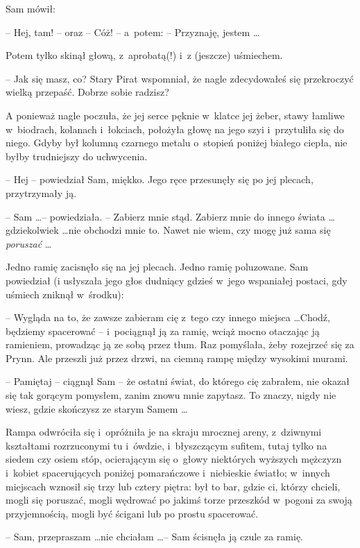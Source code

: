 \documentclass[oneside,polish,11pt,rmheadings]{mwbk}
\begin{document}
Sam mówił: 

-- Hej, tam! -- oraz -- Cóż! -- a~potem: -- Przyznaję, jestem \ldots  

Potem tylko skinął głową, z~aprobatą(!) i~z (jeszcze) uśmiechem. 

-- Jak się masz, co? Stary Pirat wspomniał, że nagle zdecydowałeś się przekroczyć wielką przepaść. Dobrze sobie radzisz? 

A ponieważ nagle poczuła, że jej serce pęknie w~klatce jej żeber, stawy łamliwe w~biodrach, kolanach i~łokciach, położyła głowę na jego szyi i~przytuliła się do niego. Gdyby był kolumną czarnego metalu o~stopień poniżej białego ciepła, nie byłby trudniejszy do uchwycenia. 

-- Hej -- powiedział Sam, miękko. Jego ręce przesunęły się po jej plecach, przytrzymały ją. 

-- Sam \ldots  -- powiedziała. -- Zabierz mnie stąd. Zabierz mnie do innego świata \ldots  gdziekolwiek \ldots   nie obchodzi mnie to. Nawet nie wiem, czy mogę już sama się \textit{poruszać } \ldots   

Jedno ramię zacisnęło się na jej plecach. Jedno ramię poluzowane. Sam powiedział (i usłyszała jego głos dudniący gdzieś w~jego wspaniałej postaci, gdy uśmiech zniknął w~środku):  

-- Wygląda na to, że zawsze zabieram cię z~tego czy innego miejsca  \ldots  Chodź, będziemy spacerować -- i~pociągnął ją za ramię, wciąż mocno otaczając ją ramieniem, prowadząc ją ze sobą przez tłum.  Raz pomyślała, żeby rozejrzeć się za Prynn. Ale przeszli już przez drzwi, na ciemną rampę między wysokimi murami. 

-- Pamiętaj -- ciągnął Sam -- że ostatni świat, do którego cię zabrałem, nie okazał się tak gorącym pomysłem, zanim znowu mnie zapytasz. To znaczy, nigdy nie wiesz, gdzie skończysz ze starym Samem \ldots  

Rampa odwróciła się i~opróżniła je na skraju mrocznej areny, z~dziwnymi kształtami rozrzuconymi tu i~ówdzie, i~błyszczącym sufitem, tutaj tylko na siedem czy osiem stóp, ocierającym się o~głowy niektórych wyższych mężczyzn i~kobiet spacerujących poniżej pomarańczowe i~niebieskie światło; w~innych miejscach wznosił się trzy lub cztery piętra: był to bar, gdzie ci, którzy chcieli, mogli się poruszać, mogli wędrować po jakimś torze przeszkód w~pogoni za swoją przyjemnością, mogli być ścigani lub po prostu spacerować. 

-- Sam, przepraszam \ldots   nie chciałam \ldots  --  Sam ścisnęła ją czule za ramię. 
\end{document}

